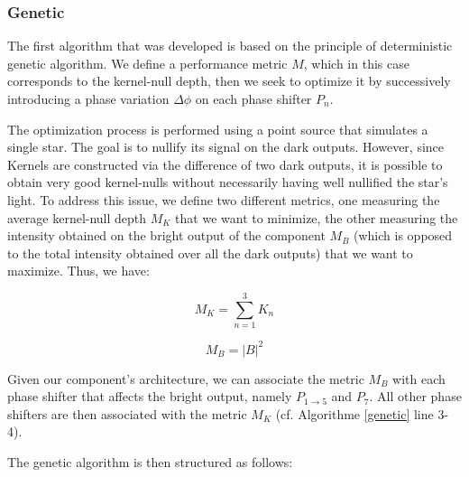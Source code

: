 \documentclass{aa}
\begin{document}
        \subsubsection{Genetic}
            The first algorithm that was developed is based on the principle of deterministic genetic algorithm. We define a performance metric $M$, which in this case corresponds to the kernel-null depth, then we seek to optimize it by successively introducing a phase variation $\Delta \phi$ on each phase shifter $P_n$.

            The optimization process is performed using a point source that simulates a single star. The goal is to nullify its signal on the dark outputs. However, since Kernels are constructed via the difference of two dark outputs, it is possible to obtain very good kernel-nulls without necessarily having well nullified the star's light. To address this issue, we define two different metrics, one measuring the average kernel-null depth $M_K$ that we want to minimize, the other measuring the intensity obtained on the bright output of the component $M_B$ (which is opposed to the total intensity obtained over all the dark outputs) that we want to maximize. Thus, we have:

            \begin{equation}
                M_K = \sum_{n=1}^3 K_n
            \end{equation}

            \begin{equation}
                M_B = |B|^2
            \end{equation}
            
            Given our component's architecture, we can associate the metric $M_B$ with each phase shifter that affects the bright output, namely $P_{1 \rightarrow 5}$ and $P_7$. All other phase shifters are then associated with the metric $M_K$ (cf. Algorithme \ref{genetic} line 3-4).

            The genetic algorithm is then structured as follows:
\end{document}
